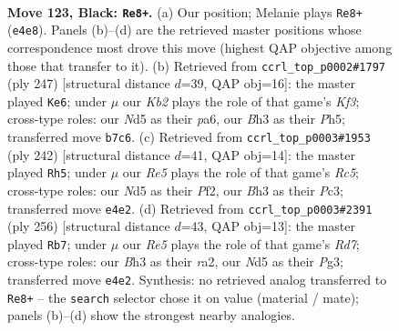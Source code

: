 \documentclass[11pt]{article}
\begin{document}
\clearpage

\begin{figure}[p]\centering
\begin{subfigure}{0.46\textwidth}\centering
\resizebox{\linewidth}{!}{%
\newchessgame
\chessboard[
  setfen={6K1/1k6/p7/P2n1p2/4rB1p/N5Pb/8/7R b - - 7 123},
  showmover=false,
  pgfstyle=straightmove, color=movearrow, markmove={e4-e8}
]}
\caption{}
\end{subfigure}\hfill
\begin{subfigure}{0.46\textwidth}\centering
\resizebox{\linewidth}{!}{%
\newchessgame
\chessboard[
  setfen={8/3R4/P4kp1/3b1p1p/5P1P/6P1/r3B3/4K3 b - - 6 124},
  showmover=false,
  pgfstyle=straightmove, color=movearrow, markmove={f6-e6}
]}
\caption{}
\end{subfigure}
\\[4pt]
\begin{subfigure}{0.46\textwidth}\centering
\resizebox{\linewidth}{!}{%
\newchessgame
\chessboard[
  setfen={8/1r6/3k4/1bR5/p1p1p3/K1P1B3/2P2P2/8 w - - 26 122},
  showmover=false,
  pgfstyle=straightmove, color=movearrow, markmove={c5-h5}
]}
\caption{}
\end{subfigure}\hfill
\begin{subfigure}{0.46\textwidth}\centering
\resizebox{\linewidth}{!}{%
\newchessgame
\chessboard[
  setfen={4k3/3Rb3/6p1/7p/4N2P/5PP1/r7/5K2 w - - 81 129},
  showmover=false,
  pgfstyle=straightmove, color=movearrow, markmove={d7-b7}
]}
\caption{}
\end{subfigure}
\caption{\textbf{Move 123, Black: \texttt{Re8+}.} (a) Our position; Melanie plays \texttt{Re8+} (\texttt{e4e8}). Panels (b)--(d) are the retrieved master positions whose correspondence most drove this move (highest QAP objective among those that transfer to it). (b) Retrieved from \texttt{ccrl\_top\_p0002\#1797} (ply 247) [structural distance $d$=39, QAP obj=16]: the master played \texttt{Ke6}; under $\mu$ our \emph{Kb2} plays the role of that game's \emph{Kf3}; cross-type roles: our \emph{N}d5 as their \emph{p}a6, our \emph{B}h3 as their \emph{P}h5; transferred move \texttt{b7c6}. (c) Retrieved from \texttt{ccrl\_top\_p0003\#1953} (ply 242) [structural distance $d$=41, QAP obj=14]: the master played \texttt{Rh5}; under $\mu$ our \emph{Re5} plays the role of that game's \emph{Rc5}; cross-type roles: our \emph{N}d5 as their \emph{P}f2, our \emph{B}h3 as their \emph{P}c3; transferred move \texttt{e4e2}. (d) Retrieved from \texttt{ccrl\_top\_p0003\#2391} (ply 256) [structural distance $d$=43, QAP obj=13]: the master played \texttt{Rb7}; under $\mu$ our \emph{Re5} plays the role of that game's \emph{Rd7}; cross-type roles: our \emph{B}h3 as their \emph{r}a2, our \emph{N}d5 as their \emph{P}g3; transferred move \texttt{e4e2}. Synthesis: no retrieved analog transferred to \texttt{Re8+} -- the \texttt{search} selector chose it on value (material / mate); panels (b)--(d) show the strongest nearby analogies.}
\label{fig:thought-m245}
\end{figure}
\end{document}
